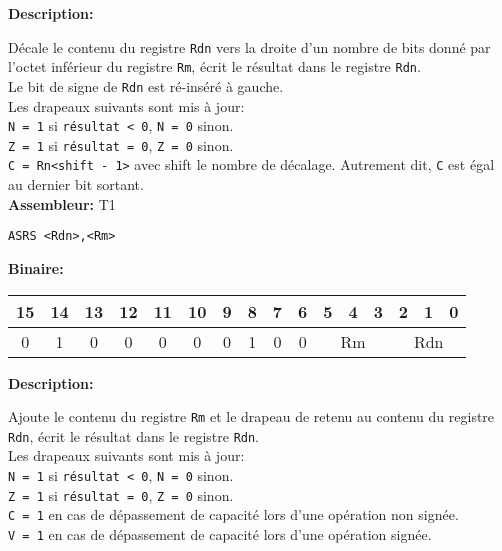 \documentclass{article}
\begin{document}

    \textbf{Description: }

    Décale le contenu du registre \texttt{Rdn} vers la droite d'un nombre de bits donné par l'octet inférieur du registre \texttt{Rm}, écrit le résultat dans le registre \texttt{Rdn}.\\
    Le bit de signe de \texttt{Rdn} est ré-inséré à gauche.\\
    Les drapeaux suivants sont mis à jour:\\
    \texttt{N = 1} si \texttt{résultat < 0}, \texttt{N = 0} sinon.\\
    \texttt{Z = 1} si \texttt{résultat = 0}, \texttt{Z = 0} sinon.\\
    \texttt{C = Rn<shift - 1>} avec shift le nombre de décalage.
    Autrement dit, \texttt{C} est égal au dernier bit sortant.\\

    \textbf{Assembleur:} T1

    \begin{lstlisting}
ASRS <Rdn>,<Rm>
    \end{lstlisting}

    \textbf{Binaire:}

    \begin{tabular}{| c c c c c c c c c c c c c c c c |}
        \hline
        15 & 14 & 13 & 12 & 11 & 10 & \multicolumn{1}{|c}{9} & 8 & 7 & 6 & \multicolumn{1}{|c}{5} & 4 & 3 & \multicolumn{1}{|c}{2} & 1 & 0 \\
        \hline
        0 & 1 & 0 & 0 & 0 & 0 & \multicolumn{1}{|c}{0} & 1 & 0 & 0 & \multicolumn{3}{|c}{Rm} & \multicolumn{3}{|c|}{Rdn} \\
        \hline
    \end{tabular}



    \textbf{Description: }

    Ajoute le contenu du registre \texttt{Rm} et le drapeau de retenu au contenu du registre \texttt{Rdn}, écrit le résultat dans le registre \texttt{Rdn}.\\
    Les drapeaux suivants sont mis à jour:\\
    \texttt{N = 1} si \texttt{résultat < 0}, \texttt{N = 0} sinon.\\
    \texttt{Z = 1} si \texttt{résultat = 0}, \texttt{Z = 0} sinon.\\
    \texttt{C = 1} en cas de dépassement de capacité lors d'une opération non signée.\\
    \texttt{V = 1} en cas de dépassement de capacité lors d'une opération signée.\\
\end{document}
